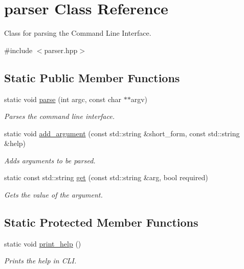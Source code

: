 \hypertarget{classparser}{}\section{parser Class Reference}
\label{classparser}


Class for parsing the Command Line Interface.  




{\ttfamily \#include $<$parser.\+hpp$>$}

\subsection*{Static Public Member Functions}
\begin{DoxyCompactItemize}
\item 
\hypertarget{classparser_a0943e09645fb7e40eef29c1726a10123}{}static void \hyperlink{classparser_a0943e09645fb7e40eef29c1726a10123}{parse} (int argc, const char $\ast$$\ast$argv)\label{classparser_a0943e09645fb7e40eef29c1726a10123}

\begin{DoxyCompactList}\small\item\em Parses the command line interface. \end{DoxyCompactList}\item 
static void \hyperlink{classparser_a031c2fe3ee51325417254fed9c0f4eeb}{add\+\_\+argument} (const std\+::string \&short\+\_\+form, const std\+::string \&help)
\begin{DoxyCompactList}\small\item\em Adds arguments to be parsed. \end{DoxyCompactList}\item 
static const std\+::string \hyperlink{classparser_ac64660f46525d680c8b12a2fbc7b7bdb}{get} (const std\+::string \&arg, bool required)
\begin{DoxyCompactList}\small\item\em Gets the value of the argument. \end{DoxyCompactList}\end{DoxyCompactItemize}
\subsection*{Static Protected Member Functions}
\begin{DoxyCompactItemize}
\item 
\hypertarget{classparser_a93a4817486f236bc1246812dbf771e7c}{}static void \hyperlink{classparser_a93a4817486f236bc1246812dbf771e7c}{print\+\_\+help} ()\label{classparser_a93a4817486f236bc1246812dbf771e7c}

\begin{DoxyCompactList}\small\item\em Prints the help in C\+L\+I. \end{DoxyCompactList}\end{DoxyCompactItemize}


